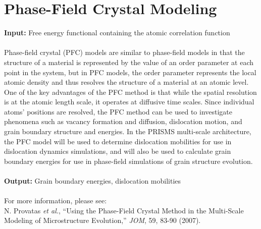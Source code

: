 \documentclass[12pt]{article}
\begin{document}

 \section{Phase-Field Crystal Modeling}
 \textbf{Input:}  Free energy functional containing the atomic correlation function\\
 \\
Phase-field crystal (PFC) models are similar to phase-field models in that the structure of a material is represented by the value of an order parameter at each point in the system, but in PFC models, the order parameter represents the local atomic density and thus resolves the structure of a material at an atomic level. One of the key advantages of the PFC method is that while the spatial resolution is at the atomic length scale, it operates at diffusive time scales. Since individual atoms' positions are resolved, the PFC method can be used to investigate phenomena such as vacancy formation and diffusion, dislocation motion, and grain boundary structure and energies. In the PRISMS multi-scale architecture, the PFC model will be used to determine dislocation mobilities for use in dislocation dynamics simulations, and will also be used to calculate grain boundary energies for use in phase-field simulations of grain structure evolution.\\
\\
\textbf{Output:} Grain boundary energies, dislocation mobilities \\
\\
For more information, please see:
\\
N. Provatas \textit{et al.}, ``Using the Phase-Field Crystal Method in the Multi-Scale Modeling of Microstructure Evolution,'' \textit{JOM}, 59, 83-90 (2007).

\end{document}

